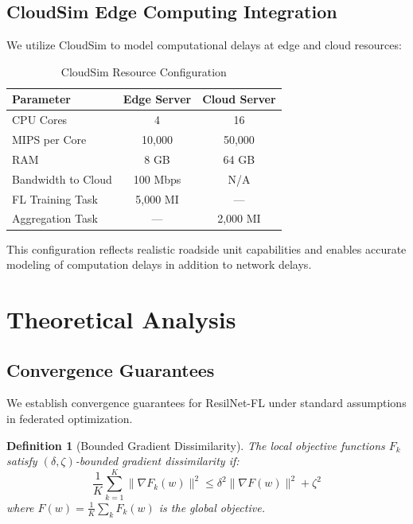 \documentclass[conference]{IEEEtran}
\newtheorem{definition}{Definition}
\begin{document}
\subsection{CloudSim Edge Computing Integration}
We utilize CloudSim to model computational delays at edge and cloud resources:

\begin{table}[htbp]
\caption{CloudSim Resource Configuration}
\label{tab:cloudsim_config}
\centering
\begin{tabular}{lcc}
\toprule
\textbf{Parameter} & \textbf{Edge Server} & \textbf{Cloud Server} \\
\midrule
CPU Cores & 4 & 16 \\
MIPS per Core & 10,000 & 50,000 \\
RAM & 8 GB & 64 GB \\
Bandwidth to Cloud & 100 Mbps & N/A \\
FL Training Task & 5,000 MI & --- \\
Aggregation Task & --- & 2,000 MI \\
\bottomrule
\end{tabular}
\end{table}

This configuration reflects realistic roadside unit capabilities and enables accurate modeling of computation delays in addition to network delays.

\section{Theoretical Analysis}

\subsection{Convergence Guarantees}
We establish convergence guarantees for ResilNet-FL under standard assumptions in federated optimization.

\begin{definition}[Bounded Gradient Dissimilarity]
The local objective functions $F_k$ satisfy $(\delta, \zeta)$-bounded gradient dissimilarity if:
\begin{equation}
\frac{1}{K} \sum_{k=1}^{K} \|\nabla F_k(w)\|^2 \leq \delta^2 \|\nabla F(w)\|^2 + \zeta^2
\end{equation}
where $F(w) = \frac{1}{K} \sum_k F_k(w)$ is the global objective.
\end{definition}
\end{document}
